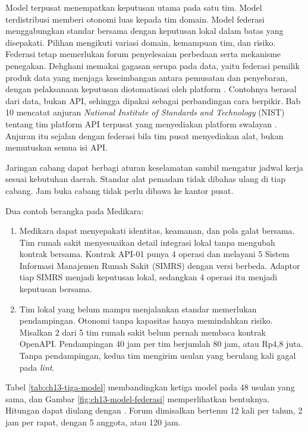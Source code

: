 Model terpusat menempatkan keputusan utama pada satu tim. Model terdistribusi memberi otonomi luas kepada tim domain. Model federasi
menggabungkan standar bersama dengan keputusan lokal dalam batas yang disepakati. Pilihan mengikuti variasi domain, kemampuan tim, dan
risiko. Federasi tetap memerlukan forum penyelesaian perbedaan serta mekanisme penegakan. Dehghani memakai gagasan serupa pada data, yaitu
federasi pemilik produk data yang menjaga keseimbangan antara pemusatan dan penyebaran, dengan pelaksanaan keputusan diotomatisasi oleh
platform \cite{c13-dehghani2020}. Contohnya berasal dari data, bukan API, sehingga dipakai sebagai perbandingan cara berpikir. Bab 10 mencatat
anjuran \textit{National Institute of Standards and Technology} (NIST) tentang tim platform API terpusat yang menyediakan platform swalayan
\cite{nist-sp800-228}. Anjuran itu sejalan dengan federasi bila tim pusat menyediakan alat, bukan memutuskan semua isi API.

Jaringan cabang dapat berbagi aturan keselamatan sambil mengatur jadwal kerja sesuai kebutuhan daerah. Standar alat pemadam tidak dibahas
ulang di tiap cabang. Jam buka cabang tidak perlu dibawa ke kantor pusat.

Dua contoh berangka pada Medikara:
\begin{enumerate}
  \item Medikara dapat menyepakati identitas, keamanan, dan pola galat bersama. Tim rumah sakit menyesuaikan detail integrasi lokal tanpa
        mengubah kontrak bersama. Kontrak API-01 punya 4 operasi dan melayani 5 Sistem Informasi Manajemen Rumah Sakit (SIMRS) dengan versi
        berbeda. Adaptor tiap SIMRS menjadi keputusan lokal, sedangkan 4 operasi itu menjadi keputusan bersama.
  \item Tim lokal yang belum mampu menjalankan standar memerlukan pendampingan. Otonomi tanpa kapasitas hanya memindahkan risiko. Misalkan 2
        dari 5 tim rumah sakit belum pernah membaca kontrak OpenAPI. Pendampingan 40 jam per tim berjumlah 80 jam, atau Rp4,8 juta. Tanpa
        pendampingan, kedua tim mengirim usulan yang berulang kali gagal pada \textit{lint}.
\end{enumerate}

Tabel \ref{tab:ch13-tiga-model} membandingkan ketiga model pada 48 usulan yang sama, dan Gambar \ref{fig:ch13-model-federasi}
memperlihatkan bentuknya. Hitungan dapat diulang dengan . Forum dimisalkan bertemu 12 kali
per tahun, 2 jam per rapat, dengan 5 anggota, atau 120 jam.

